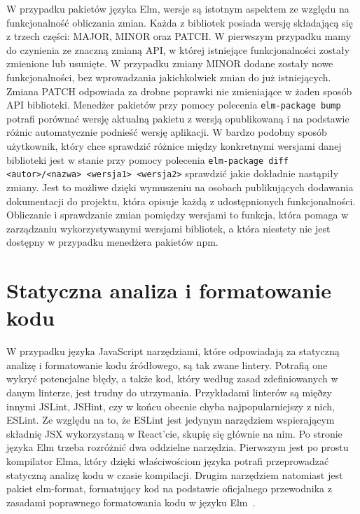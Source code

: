 W przypadku pakietów języka Elm, wersje są istotnym aspektem ze względu na funkcjonalność obliczania zmian. Każda z bibliotek posiada wersję składającą się z trzech części: MAJOR, MINOR oraz PATCH. W pierwszym przypadku mamy do czynienia ze znaczną zmianą API, w której istniejące funkcjonalności zostały zmienione lub usunięte. W przypadku zmiany MINOR dodane zostały nowe funkcjonalności, bez wprowadzania jakichkolwiek zmian do już istniejących. Zmiana PATCH odpowiada za drobne poprawki nie zmieniające w żaden sposób API biblioteki. Menedżer pakietów przy pomocy polecenia \lstinline{elm-package bump} potrafi porównać wersję aktualną pakietu z wersją opublikowaną i na podstawie różnic automatycznie podnieść wersję aplikacji. W bardzo podobny sposób użytkownik, który chce sprawdzić różnice między konkretnymi wersjami danej biblioteki jest w stanie przy pomocy polecenia \lstinline{elm-package diff <autor>/<nazwa> <wersja1> <wersja2>} sprawdzić jakie dokładnie nastąpiły zmiany. Jest to możliwe dzięki wymuszeniu na osobach publikujących dodawania dokumentacji do projektu, która opisuje każdą z udostępnionych funkcjonalności. Obliczanie i sprawdzanie zmian pomiędzy wersjami to funkcja, która pomaga w zarządzaniu wykorzystywanymi wersjami bibliotek, a która niestety nie jest dostępny w przypadku menedżera pakietów npm.

\section{Statyczna analiza i formatowanie kodu}
W przypadku języka JavaScript narzędziami, które odpowiadają za statyczną analizę i formatowanie kodu źródłowego, są tak zwane lintery. Potrafią one wykryć potencjalne błędy, a także kod, który według zasad zdefiniowanych w danym linterze, jest trudny do utrzymania. Przykładami linterów są mięðzy innymi JSLint, JSHint, czy w końcu obecnie chyba najpopularniejszy z nich, ESLint. Ze względu na to, że ESLint jest jedynym narzędziem wspierającym składnię JSX wykorzystaną w React'cie, skupię się głównie na nim. Po stronie języka Elm trzeba rozróżnić dwa oddzielne narzędzia. Pierwszym jest po prostu kompilator Elma, który dzięki właściwościom języka potrafi przeprowadzać statyczną analizę kodu w czasie kompilacji. Drugim narzędziem natomiast jest pakiet elm-format, formatujący kod na podstawie oficjalnego przewodnika z zasadami poprawnego formatowania kodu w języku Elm~\cite{elmStyleGuide}. 

